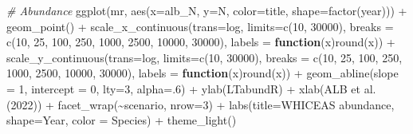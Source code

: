 \documentclass[
]{book}
\newenvironment{Shaded}{\begin{snugshade}}{\end{snugshade}}
\newcommand{\AttributeTok}[1]{\textcolor[rgb]{0.77,0.63,0.00}{#1}}
\newcommand{\CommentTok}[1]{\textcolor[rgb]{0.56,0.35,0.01}{\textit{#1}}}
\newcommand{\ControlFlowTok}[1]{\textcolor[rgb]{0.13,0.29,0.53}{\textbf{#1}}}
\newcommand{\DecValTok}[1]{\textcolor[rgb]{0.00,0.00,0.81}{#1}}
\newcommand{\FunctionTok}[1]{\textcolor[rgb]{0.00,0.00,0.00}{#1}}
\newcommand{\NormalTok}[1]{#1}
\newcommand{\SpecialCharTok}[1]{\textcolor[rgb]{0.00,0.00,0.00}{#1}}
\newcommand{\StringTok}[1]{\textcolor[rgb]{0.31,0.60,0.02}{#1}}
\begin{document}
\begin{Shaded}
\begin{Highlighting}[]
\CommentTok{\# Abundance}
\FunctionTok{ggplot}\NormalTok{(mr,}
       \FunctionTok{aes}\NormalTok{(}\AttributeTok{x=}\NormalTok{alb\_N, }\AttributeTok{y=}\NormalTok{N, }
           \AttributeTok{color=}\NormalTok{title, }\AttributeTok{shape=}\FunctionTok{factor}\NormalTok{(year))) }\SpecialCharTok{+}
    \FunctionTok{geom\_point}\NormalTok{() }\SpecialCharTok{+}
    \FunctionTok{scale\_x\_continuous}\NormalTok{(}\AttributeTok{trans=}\StringTok{\textquotesingle{}log\textquotesingle{}}\NormalTok{, }
                       \AttributeTok{limits=}\FunctionTok{c}\NormalTok{(}\DecValTok{10}\NormalTok{, }\DecValTok{30000}\NormalTok{), }
                       \AttributeTok{breaks =} \FunctionTok{c}\NormalTok{(}\DecValTok{10}\NormalTok{, }\DecValTok{25}\NormalTok{, }\DecValTok{100}\NormalTok{, }\DecValTok{250}\NormalTok{, }\DecValTok{1000}\NormalTok{, }\DecValTok{2500}\NormalTok{, }\DecValTok{10000}\NormalTok{, }\DecValTok{30000}\NormalTok{),}
                       \AttributeTok{labels =} \ControlFlowTok{function}\NormalTok{(x)}\FunctionTok{round}\NormalTok{(x)) }\SpecialCharTok{+}
    \FunctionTok{scale\_y\_continuous}\NormalTok{(}\AttributeTok{trans=}\StringTok{\textquotesingle{}log\textquotesingle{}}\NormalTok{, }
                       \AttributeTok{limits=}\FunctionTok{c}\NormalTok{(}\DecValTok{10}\NormalTok{, }\DecValTok{30000}\NormalTok{), }
                       \AttributeTok{breaks =} \FunctionTok{c}\NormalTok{(}\DecValTok{10}\NormalTok{, }\DecValTok{25}\NormalTok{, }\DecValTok{100}\NormalTok{, }\DecValTok{250}\NormalTok{, }\DecValTok{1000}\NormalTok{, }\DecValTok{2500}\NormalTok{, }\DecValTok{10000}\NormalTok{, }\DecValTok{30000}\NormalTok{),}
                       \AttributeTok{labels =} \ControlFlowTok{function}\NormalTok{(x)}\FunctionTok{round}\NormalTok{(x)) }\SpecialCharTok{+}
    \FunctionTok{geom\_abline}\NormalTok{(}\AttributeTok{slope =} \DecValTok{1}\NormalTok{, }\AttributeTok{intercept =} \DecValTok{0}\NormalTok{, }\AttributeTok{lty=}\DecValTok{3}\NormalTok{, }\AttributeTok{alpha=}\NormalTok{.}\DecValTok{6}\NormalTok{) }\SpecialCharTok{+}
    \FunctionTok{ylab}\NormalTok{(}\StringTok{\textquotesingle{}LTabundR\textquotesingle{}}\NormalTok{) }\SpecialCharTok{+} \FunctionTok{xlab}\NormalTok{(}\StringTok{\textquotesingle{}ALB et al. (2022)\textquotesingle{}}\NormalTok{) }\SpecialCharTok{+}
  \FunctionTok{facet\_wrap}\NormalTok{(}\SpecialCharTok{\textasciitilde{}}\NormalTok{scenario, }\AttributeTok{nrow=}\DecValTok{3}\NormalTok{) }\SpecialCharTok{+} 
  \FunctionTok{labs}\NormalTok{(}\AttributeTok{title=}\StringTok{\textquotesingle{}WHICEAS abundance\textquotesingle{}}\NormalTok{, }
       \AttributeTok{shape=}\StringTok{\textquotesingle{}Year\textquotesingle{}}\NormalTok{, }\AttributeTok{color =} \StringTok{\textquotesingle{}Species\textquotesingle{}}\NormalTok{) }\SpecialCharTok{+} 
  \FunctionTok{theme\_light}\NormalTok{()}
\end{Highlighting}
\end{Shaded}
\end{document}
